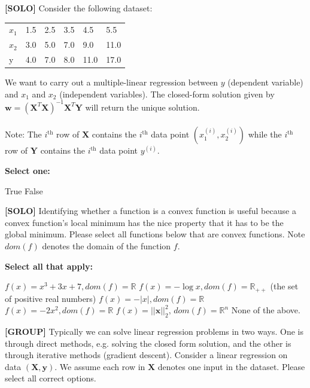\documentclass[11pt,addpoints,answers]{exam}
\newcommand{\wv}{\mathbf{w}}
\newcommand{\xv}{\mathbf{x}}
\newcommand{\yv}{\mathbf{y}}
\newcommand{\Xv}{\mathbf{X}}
\newcommand{\Yv}{\mathbf{Y}}
\begin{document}
\begin{questions}
    
    \question[1] \textbf{[SOLO]} Consider the following dataset:
        \begin{table}[H]
    \centering
        \begin{tabular}{llllll}
        $x_1$ & 1.5 & 2.5 & 3.5 & 4.5 & 5.5 \\
        $x_2$ & 3.0 & 5.0 & 7.0 & 9.0 & 11.0 \\
        y & 4.0 & 7.0 & 8.0 & 11.0 & 17.0
        \end{tabular}
    \end{table}
   We want to carry out a multiple-linear regression between $y$ (dependent variable) and $x_1$ and $x_2$ (independent variables). The closed-form solution given by $\wv = \left(\Xv^T\Xv\right)^{-1}\Xv^T \Yv$ will return the unique solution. 
    \\~\\
    Note: The $i^{\text{th}}$ row of $\Xv$ contains the $i^{\text{th}}$ data point $(x_1^{(i)}, x_2^{(i)})$ while the $i^{\text{th}}$ row of $\Yv$ contains the $i^{\text{th}}$ data point $y^{(i)}$. 
    
        \textbf{Select one:}
    \begin{checkboxes}
        \choice True
        \CorrectChoice False
    \end{checkboxes}
    
    
    \clearpage
    
     \question[3] \textbf{[SOLO]} Identifying whether a function is a convex function is useful because a convex function's local minimum has the nice property that it has to be the global minimum. Please select all functions below that are convex functions. Note $dom(f)$ denotes the domain of the function $f$. \\
        {%
    \checkboxchar{$\Box$} \checkedchar{$\blacksquare$}
    \textbf{Select all that apply:}
    \begin{checkboxes}
        \choice $f(x) = x^3 + 3x + 7, dom(f) = \mathbb{R}$
        \CorrectChoice $f(x) = -\log x, dom(f) = \mathbb{R}_{++}$ (the set of positive real numbers)
        \choice $f(x) = -|x|, dom(f) = \mathbb{R}$
        \choice $f(x) = -2x^2, dom(f) = \mathbb{R}$
        \CorrectChoice $f(x) = ||\xv||_2^2,\, dom(f) = \mathbb{R}^n$
        \choice None of the above.
    \end{checkboxes}
    }


    \question[2] \textbf{[GROUP]} Typically we can solve linear regression problems in two ways. One is through direct methods, e.g. solving the closed form solution, and the other is through iterative methods (gradient descent). Consider a linear regression on data $(\Xv, \yv)$. We assume each row in $\Xv$ denotes one input in the dataset. Please select all correct options.
    

\end{questions}
\end{document}
